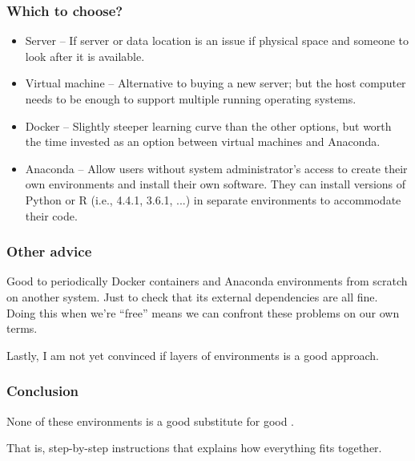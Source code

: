 \documentclass[11pt,aspectratio=43,ignorenonframetext,t]{beamer}
\begin{document}
\begin{frame}

\frametitle{Which to choose?}

\begin{itemize}
  \item Server -- If server or data location is an issue {} if physical space and someone to look after it is available.
  \item Virtual machine -- Alternative to buying a new server; but the host computer needs to be {} enough to support multiple running operating systems.
  \item Docker -- Slightly steeper learning curve than the other options, but worth the time invested as an {} option between virtual machines and Anaconda.
  \item Anaconda -- Allow users without system administrator's access to create their own environments and install their own software.  They can install {} versions of Python or R (i.e., 4.4.1, 3.6.1, ...) in separate environments to accommodate their code.
\end{itemize}

\end{frame}


\begin{frame}

\frametitle{Other advice}

Good to periodically {} Docker containers and Anaconda environments from scratch on another system.  Just to check that its external dependencies are all fine.  Doing this when we're ``free'' means we can confront these problems on our own terms.
\vs

Lastly, I am not yet convinced if layers of environments is a good approach.

\end{frame}


\begin{frame}

\frametitle{Conclusion}

None of these environments is a good substitute for good {}.
\vs

That is, step-by-step instructions that explains how everything fits together.

\end{frame}
\end{document}
